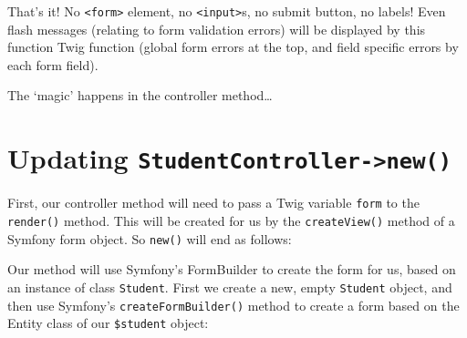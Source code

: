 \documentclass[a4paperpaper,openright]{book}
\newenvironment{Shaded}{}{}
\newcommand{\KeywordTok}[1]{\textcolor[rgb]{0.00,0.44,0.13}{\textbf{#1}}}
\newcommand{\NormalTok}[1]{#1}
\newcommand{\OtherTok}[1]{\textcolor[rgb]{0.00,0.44,0.13}{#1}}
\newcommand{\StringTok}[1]{\textcolor[rgb]{0.25,0.44,0.63}{#1}}
\begin{document}
That's it! No \texttt{\textless{}form\textgreater{}} element, no
\texttt{\textless{}input\textgreater{}}s, no submit button, no labels!
Even flash messages (relating to form validation errors) will be
displayed by this function Twig function (global form errors at the top,
and field specific errors by each form field).

The `magic' happens in the controller method\ldots{}

\hypertarget{updating-studentcontroller-new}{%
\section{\texorpdfstring{Updating
\texttt{StudentController-\textgreater{}new()}}{Updating StudentController-\textgreater{}new()}}\label{updating-studentcontroller-new}}

First, our controller method will need to pass a Twig variable
\texttt{form} to the \texttt{render()} method. This will be created for
us by the \texttt{createView()} method of a Symfony form object. So
\texttt{new()} will end as follows:

\begin{Shaded}
\end{Shaded}

Our method will use Symfony's FormBuilder to create the form for us,
based on an instance of class \texttt{Student}. First we create a new,
empty \texttt{Student} object, and then use Symfony's
\texttt{createFormBuilder()} method to create a form based on the Entity
class of our \texttt{\$student} object:
\end{document}
